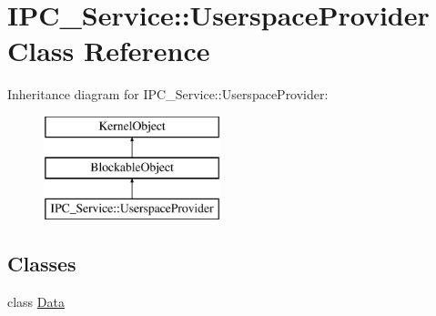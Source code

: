 \hypertarget{class_i_p_c___service_1_1_userspace_provider}{}\section{I\+P\+C\+\_\+\+Service\+:\+:Userspace\+Provider Class Reference}
\label{class_i_p_c___service_1_1_userspace_provider}
Inheritance diagram for I\+P\+C\+\_\+\+Service\+:\+:Userspace\+Provider\+:\begin{figure}[H]
\begin{center}
\leavevmode
\includegraphics[height=3.000000cm]{class_i_p_c___service_1_1_userspace_provider}
\end{center}
\end{figure}
\subsection*{Classes}
\begin{DoxyCompactItemize}
\item 
class \hyperlink{class_i_p_c___service_1_1_userspace_provider_1_1_data}{Data}
\end{DoxyCompactItemize}
